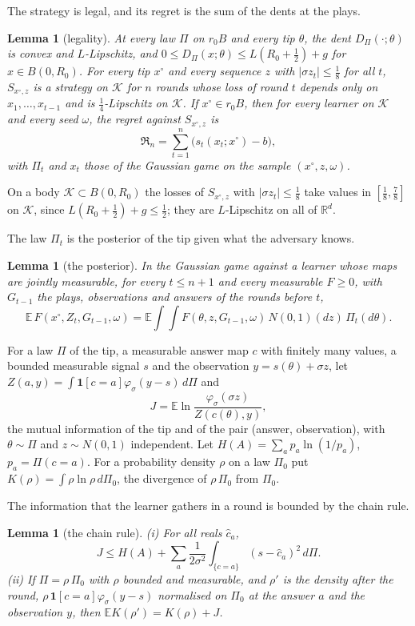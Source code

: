 \documentclass[11pt]{amsart}
\newtheorem{lemma}[theorem]{Lemma}
\theoremstyle{definition}
\numberwithin{equation}{section}
\newcommand{\R}{\mathbb{R}}
\newcommand{\E}{\mathbb{E}}
\newcommand{\cK}{\mathcal{K}}
\newcommand{\Reg}{\mathfrak{R}}
\begin{document}
The strategy is legal, and its regret is the sum of the dents at the plays.

\begin{lemma}[legality]\label{lem:legal}
At every law $\Pi$ on $r_0B$ and every tip $\theta$, the dent $D_\Pi(\cdot;\theta)$ is convex and $L$-Lipschitz, and $0\le D_\Pi(x;\theta)\le L(R_0+\frac12)+g$ for $x\in B(0,R_0)$. For every tip $x^\circ$ and every sequence $z$ with $|\sigma z_t|\le\frac18$ for all $t$, $S_{x^\circ,z}$ is a strategy on $\cK$ for $n$ rounds whose loss of round $t$ depends only on $x_1,\dots,x_{t-1}$ and is $\frac14$-Lipschitz on $\cK$. If $x^\circ\in r_0B$, then for every learner on $\cK$ and every seed $\omega$, the regret against $S_{x^\circ,z}$ is
\[
\Reg_n=\sum_{t=1}^n\bigl(s_t(x_t;x^\circ)-b\bigr),
\]
with $\Pi_t$ and $x_t$ those of the Gaussian game on the sample $(x^\circ,z,\omega)$.
\end{lemma}

On a body $\cK\subset B(0,R_0)$ the losses of $S_{x^\circ,z}$ with $|\sigma z_t|\le\frac18$ take values in $[\frac18,\frac78]$ on $\cK$, since $L(R_0+\frac12)+g\le\frac12$; they are $L$-Lipschitz on all of $\R^d$.

The law $\Pi_t$ is the posterior of the tip given what the adversary knows.

\begin{lemma}[the posterior]\label{lem:post}
In the Gaussian game against a learner whose maps are jointly measurable, for every $t\le n+1$ and every measurable $F\ge0$, with $G_{t-1}$ the plays, observations and answers of the rounds before $t$,
\[
\E\,F(x^\circ,Z_t,G_{t-1},\omega)=\E\int\!\!\int F(\theta,z,G_{t-1},\omega)\,N(0,1)(dz)\,\Pi_t(d\theta).
\]
\end{lemma}

For a law $\Pi$ of the tip, a measurable answer map $c$ with finitely many values, a bounded measurable signal $s$ and the observation $y=s(\theta)+\sigma z$, let $Z(a,y)=\int\mathbf 1[c=a]\varphi_\sigma(y-s)\,d\Pi$ and
\[
J=\E\ln\frac{\varphi_\sigma(\sigma z)}{Z(c(\theta),y)},
\]
the mutual information of the tip and of the pair (answer, observation), with $\theta\sim\Pi$ and $z\sim N(0,1)$ independent. Let $H(A)=\sum_ap_a\ln(1/p_a)$, $p_a=\Pi(c=a)$. For a probability density $\rho$ on a law $\Pi_0$ put $K(\rho)=\int\rho\ln\rho\,d\Pi_0$, the divergence of $\rho\,\Pi_0$ from $\Pi_0$.

The information that the learner gathers in a round is bounded by the chain rule.

\begin{lemma}[the chain rule]\label{lem:chain}
(i) For all reals $\hat c_a$,
\[
J\le H(A)+\sum_a\frac{1}{2\sigma^2}\int_{\{c=a\}}(s-\hat c_a)^2\,d\Pi.
\]
(ii) If $\Pi=\rho\,\Pi_0$ with $\rho$ bounded and measurable, and $\rho'$ is the density after the round, $\rho\,\mathbf 1[c=a]\varphi_\sigma(y-s)$ normalised on $\Pi_0$ at the answer $a$ and the observation $y$, then $\E K(\rho')=K(\rho)+J$.
\end{lemma}
\end{document}

